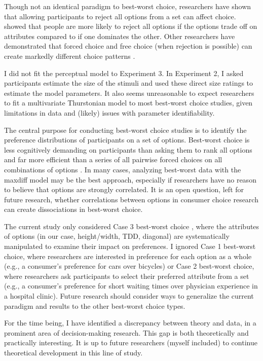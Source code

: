 Though not an identical paradigm to best-worst choice, researchers have shown that allowing participants to reject all options from a set can affect choice. \textcite{tverskyChoiceConflictDynamics1992a} showed that people are more likely to reject all options if the options trade off on attributes compared to if one dominates the other. Other researchers have demonstrated that forced choice and free choice (when rejection is possible) can create markedly different choice patterns \parencite{dhar1997consumer,dhar1997context,dhar1996effect,dharEffectForcedChoice2003b,noguchiDescriptionexperienceGapChoice2016a,brazellNochoiceOptionDual2006b,parker2011rejectable,chernevChoiceOverloadConceptual2015}. 

I did not fit the perceptual model to Experiment 3. In Experiment 2, I asked participants estimate the size of the stimuli and used these direct size ratings to estimate the model parameters. It also seems unreasonable to expect researchers to fit a multivariate Thurstonian model to most best-worst choice studies, given limitations in data and (likely) issues with parameter identifiability. 

The central purpose for conducting best-worst choice studies is to identify the preference distributions of participants on a set of options. Best-worst choice is less cognitively demanding on participants than asking them to rank all options and far more efficient than a series of all pairwise forced choices on all combinations of options \parencite{louviere2008modeling}. In many cases, analyzing best-worst data with the maxdiff model may be the best approach, especially if researchers have no reason to believe that options are strongly correlated. It is an open question, left for future research, whether correlations between options in consumer choice research can create dissociations in best-worst choice. 

The current study only considered Case 3 best-worst choice \parencite{marleyModelsBestWorst2012}, where the attributes of options (in our case, height/width, TDD, diagonal) are systematically manipulated to examine their impact on preferences. I ignored Case 1 best-worst choice, where researchers are interested in preference for each option as a whole (e.g., a consumer's preference for cars over bicycles) or Case 2 best-worst choice, where researchers ask participants to select their preferred attribute from a set (e.g., a consumer's preference for short waiting times over physician experience in a hospital clinic). Future research should consider ways to generalize the current paradigm and results to the other best-worst choice types.

For the time being, I have identified a discrepancy between theory and data, in a prominent area of decision-making research. This gap is both theoretically and practically interesting. It is up to future researchers (myself included) to continue theoretical development in this line of study. 